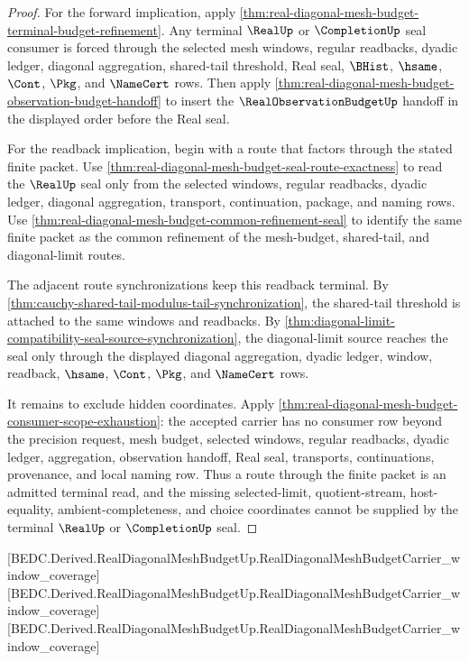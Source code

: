 \begin{proof}
For the forward implication, apply \autoref{thm:real-diagonal-mesh-budget-terminal-budget-refinement}. Any terminal $\RealUp$ or $\CompletionUp$ seal consumer is forced through the selected mesh windows, regular readbacks, dyadic ledger, diagonal aggregation, shared-tail threshold, Real seal, $\BHist$, $\hsame$, $\Cont$, $\Pkg$, and $\NameCert$ rows. Then apply \autoref{thm:real-diagonal-mesh-budget-observation-budget-handoff} to insert the $\RealObservationBudgetUp$ handoff in the displayed order before the Real seal.

For the readback implication, begin with a route that factors through the stated finite packet. Use \autoref{thm:real-diagonal-mesh-budget-seal-route-exactness} to read the $\RealUp$ seal only from the selected windows, regular readbacks, dyadic ledger, diagonal aggregation, transport, continuation, package, and naming rows. Use \autoref{thm:real-diagonal-mesh-budget-common-refinement-seal} to identify the same finite packet as the common refinement of the mesh-budget, shared-tail, and diagonal-limit routes.

The adjacent route synchronizations keep this readback terminal. By \autoref{thm:cauchy-shared-tail-modulus-tail-synchronization}, the shared-tail threshold is attached to the same windows and readbacks. By \autoref{thm:diagonal-limit-compatibility-seal-source-synchronization}, the diagonal-limit source reaches the seal only through the displayed diagonal aggregation, dyadic ledger, window, readback, $\hsame$, $\Cont$, $\Pkg$, and $\NameCert$ rows.

It remains to exclude hidden coordinates. Apply \autoref{thm:real-diagonal-mesh-budget-consumer-scope-exhaustion}: the accepted carrier has no consumer row beyond the precision request, mesh budget, selected windows, regular readbacks, dyadic ledger, aggregation, observation handoff, Real seal, transports, continuations, provenance, and local naming row. Thus a route through the finite packet is an admitted terminal read, and the missing selected-limit, quotient-stream, host-equality, ambient-completeness, and choice coordinates cannot be supplied by the terminal $\RealUp$ or $\CompletionUp$ seal.
\end{proof}

[BEDC.Derived.RealDiagonalMeshBudgetUp.RealDiagonalMeshBudgetCarrier\_window\_coverage]
[BEDC.Derived.RealDiagonalMeshBudgetUp.RealDiagonalMeshBudgetCarrier\_window\_coverage]
[BEDC.Derived.RealDiagonalMeshBudgetUp.RealDiagonalMeshBudgetCarrier\_window\_coverage]

